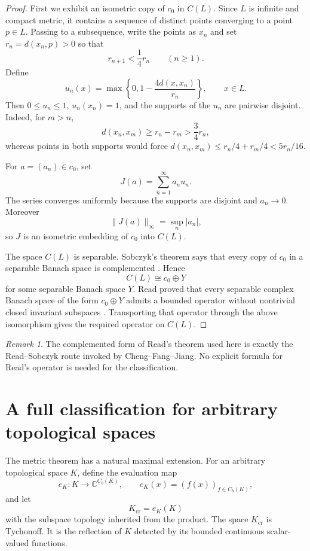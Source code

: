 \documentclass[11pt]{article}
\theoremstyle{remark}
\newtheorem{remark}[theorem]{Remark}
\newcommand{\Cb}{C_b}
\newcommand{\C}{\mathbb C}
\begin{document}
\begin{proof}
First we exhibit an isometric copy of $c_0$ in $C(L)$.  Since $L$ is infinite
and compact metric, it contains a sequence of distinct points converging to a
point $p\in L$.  Passing to a subsequence, write the points as $x_n$ and set
$r_n=d(x_n,p)>0$ so that
\[
  r_{n+1}<\frac14 r_n\qquad(n\geq1).
\]
Define
\[
  u_n(x)=\max\left\{0,1-\frac{4d(x,x_n)}{r_n}\right\},\qquad x\in L.
\]
Then $0\leq u_n\leq1$, $u_n(x_n)=1$, and the supports of the $u_n$ are
pairwise disjoint.  Indeed, for $m>n$,
\[
  d(x_n,x_m)\geq r_n-r_m>\frac34r_n,
\]
whereas points in both supports would force
$d(x_n,x_m)\leq r_n/4+r_m/4<5r_n/16$.

For $a=(a_n)\in c_0$, set
\[
  J(a)=\sum_{n=1}^{\infty}a_nu_n.
\]
The series converges uniformly because the supports are disjoint and
$a_n\to0$.  Moreover
\[
  \lVert J(a)\rVert_\infty=\sup_n|a_n|,
\]
so $J$ is an isometric embedding of $c_0$ into $C(L)$.

The space $C(L)$ is separable.  Sobczyk's theorem says that every copy of
$c_0$ in a separable Banach space is complemented \cite{Sobczyk}.  Hence
\[
  C(L)\cong c_0\oplus Y
\]
for some separable Banach space $Y$.  Read proved that every separable complex
Banach space of the form $c_0\oplus Y$ admits a bounded operator without
nontrivial closed invariant subspaces \cite{Read}.  Transporting that operator
through the above isomorphism gives the required operator on $C(L)$.
\end{proof}

\begin{remark}
The complemented form of Read's theorem used here is exactly the
Read--Sobczyk route invoked by Cheng--Fang--Jiang.  No explicit formula for
Read's operator is needed for the classification.
\end{remark}

\section{A full classification for arbitrary topological spaces}
\label{sec:classification}

The metric theorem has a natural maximal extension.  For an arbitrary
topological space $K$, define the evaluation map
\[
  e_K:K\longrightarrow \C^{\Cb(K)},\qquad
  e_K(x)=(f(x))_{f\in\Cb(K)},
\]
and let
\[
  K_{\mathrm{cr}}=e_K(K)
\]
with the subspace topology inherited from the product.  The space
$K_{\mathrm{cr}}$ is Tychonoff.  It is the reflection of $K$ detected by its
bounded continuous scalar-valued functions.
\end{document}
